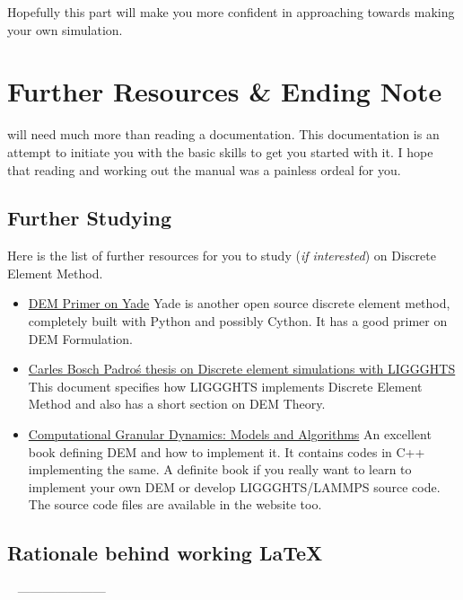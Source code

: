 \documentclass{tufte-book} %
\begin{document}
Hopefully this part will make you more confident in approaching towards making your own simulation.

\chapter{Further Resources \& Ending Note}
\label{chap:4}

\begin{fullwidth}
   will need much more than reading a documentation. This documentation is an attempt to initiate you with the basic skills to get you started with it. I hope that reading and working out the manual was a painless ordeal for you.  
\end{fullwidth}

\section{Further Studying}

Here is the list of further resources for you to study (\textit{if interested}) on Discrete Element Method.
\begin{itemize}
\item \href{https://yade-dem.org/doc/formulation.html}{DEM Primer on Yade}
  Yade is another open source discrete element method, completely built with Python and possibly Cython. It has a good primer on DEM Formulation. 
\item \href{http://www.cimne.com/cvdata/cntr2/spc31/dtos/img/mdia/thesis/CarlesBosch.pdf}{Carles Bosch Padro\'s thesis on Discrete element simulations with LIGGGHTS}
  This document specifies how LIGGGHTS implements Discrete Element Method and also has a short section on DEM Theory. 
\item \href{www.springer.com/us/book/9783540214854}{Computational Granular Dynamics: Models and Algorithms}
  An excellent book defining DEM and how to implement it. It contains codes in C++ implementing the same. A definite book if you really want to learn to implement your own DEM or develop LIGGGHTS/LAMMPS source code. The source code files are available in the website too. 
\end{itemize}

\section{Rationale behind working \LaTeX}
\
 ---------------------



\printindex %
\end{document}
